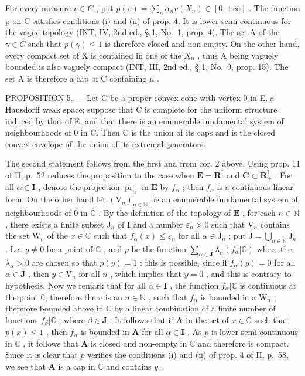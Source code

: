 For every measure \(v \in C\) , put \(p(v) = \sum_{n} \alpha_{n} v(X_{n}) \in [0, +\infty]\) . The function p on C satisfies conditions (i) and (ii) of prop. 4. It is lower semi-continuous for the vague topology (INT, IV, 2nd ed., § 1, No.~1, prop. 4). The set A of the \(\gamma \in C\) such that \(p(\gamma) \leqslant 1\) is therefore closed and non-empty. On the other hand, every compact set of X is contained in one of the \(X_{n}\) , thus A being vaguely bounded is also vaguely compact (INT, III, 2nd ed., § 1, No.~9, prop. 15). The set A is therefore a cap of C containing \(\mu\) .

PROPOSITION 5. --- Let C be a proper convex cone with vertex 0 in E, a Hausdorff weak space; suppose that C is complete for the uniform structure induced by that of E, and that there is an enumerable fundamental system of neighbourhoods of 0 in C. Then C is the union of its caps and is the closed convex envelope of the union of its extremal generators.

The second statement follows from the first and from cor. 2 above. Using prop. 11 of II, p.~52 reduces the proposition to the case when \(\mathbf{E} = \mathbf{R}^{\mathrm{I}}\) and \(\mathbf{C} \subset \mathbf{R}_{+}^{\mathrm{I}}\) . For all \(\alpha \in \mathbf{I}\) , denote the projection \(\operatorname{pr}_{\alpha}\) in \(\mathbf{E}\) by \(f_{\alpha}\) ; then \(f_{\alpha}\) is a continuous linear form. On the other hand let \((\mathrm{V}_n)_{n \in \mathbb{N}}\) be an enumerable fundamental system of neighbourhoods of 0 in \(\mathbb{C}\) . By the definition of the topology of \(\mathbf{E}\) , for each \(n \in \mathbb{N}\) , there exists a finite subset \(\mathrm{J}_n\) of \(\mathbf{I}\) and a number \(\varepsilon_n > 0\) such that \(\mathrm{V}_n\) contains the set \(\mathrm{W}_n\) of the \(x \in \mathbb{C}\) such that \(f_{\alpha}(x) \leqslant \varepsilon_n\) for all \(\alpha \in \mathrm{J}_n\) ; put \(\mathrm{J} = \bigcup_{n \in \mathbb{N}} \mathrm{J}_n\) . Let \(y \neq 0\) be a point of \(\mathbb{C}\) , and \(p\) be the function \(\sum_{\alpha \in \mathbf{J}} \lambda_{\alpha}(f_{\alpha}|\mathbb{C})\) where the \(\lambda_{\alpha} > 0\) are chosen so that \(p(y) = 1\) ; this is possible, since if \(f_{\alpha}(y) = 0\) for all \(\alpha \in \mathbf{J}\) , then \(y \in \mathrm{V}_n\) for all \(n\) , which implies that \(y = 0\) , and this is contrary to hypothesis. Now we remark that for all \(\alpha \in \mathbf{I}\) , the function \(f_{\alpha}|\mathbb{C}\) is continuous at the point 0, therefore there is an \(n \in \mathbb{N}\) , such that \(f_{\alpha}\) is bounded in a \(\mathrm{W}_n\) , therefore bounded above in \(\mathbb{C}\) by a linear combination of a finite number of functions \(f_{\beta}|\mathbb{C}\) , where \(\beta \in \mathbf{J}\) . It follows that if \(\mathbf{A}\) in the set of \(x \in \mathbb{C}\) such that \(p(x) \leqslant 1\) , then \(f_{\alpha}\) is bounded in \(\mathbf{A}\) for all \(\alpha \in \mathbf{I}\) . As \(p\) is lower semi-continuous in \(\mathbb{C}\) , it follows that \(\mathbf{A}\) is closed and non-empty in \(\mathbb{C}\) and therefore is compact. Since it is clear that \(p\) verifies the conditions (i) and (ii) of prop. 4 of II, p.~58, we see that \(\mathbf{A}\) is a cap in \(\mathbb{C}\) and contains \(y\) .

